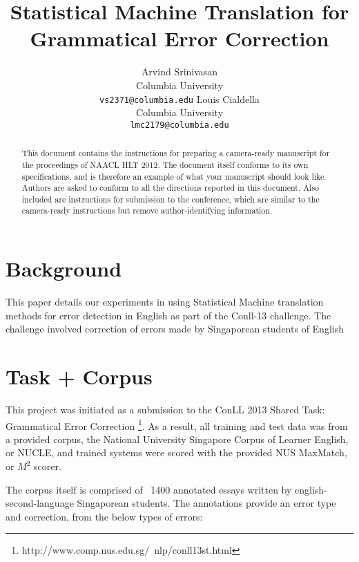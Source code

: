 \documentclass[11pt,letterpaper]{article}
\title{Statistical Machine Translation for Grammatical Error Correction}
\author{Arvind Srinivasan\\
	    Columbia University\\
	    {\tt vs2371@columbia.edu}
	  \And
	Louis Cialdella\\
  	Columbia University\\
  {\tt lmc2179@columbia.edu}}
\date{}
\begin{document}
\maketitle
\begin{abstract}
  This document contains the instructions for preparing a camera-ready
  manuscript for the proceedings of NAACL HLT 2012. The document itself conforms
  to its own specifications, and is therefore an example of what
  your manuscript should look like.  Authors are asked to conform to
  all the directions reported in this document.  Also included are instructions for
  submission to the conference, which are similar to the camera-ready instructions
  but remove author-identifying information.
\end{abstract}

\section{Background}

This paper details our experiments in using Statistical Machine translation methods for 
error detection in English as part of the Conll-13 challenge. The challenge involved 
correction of errors made by Singaporean students of English

\section{Task + Corpus}

This project was initiated as a submission to the ConLL 2013 Shared Task: Grammatical Error Correction \footnote{http://www.comp.nus.edu.sg/~nlp/conll13st.html}. As a result, all training and test data was from a provided corpus, the National University Singapore Corpus of Learner English, or NUCLE, and trained systems were scored with the provided NUS MaxMatch, or $M^2$ scorer. 

The corpus itself is comprised of ~1400 annotated essays written by english-second-language Singaporean students. The annotations provide an error type and correction, from the below types of errors:
\end{document}
